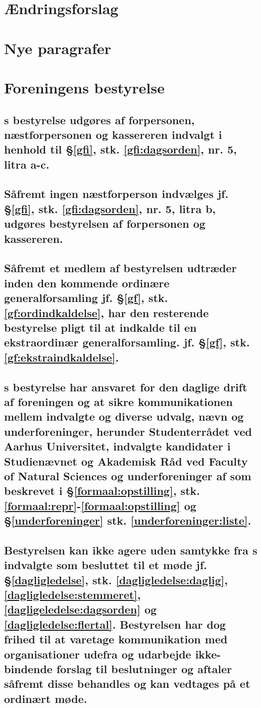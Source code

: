 \section*{Ændringsforslag}

\section*{Nye paragrafer}
\section*{Foreningens bestyrelse}

\subsection{\fagr{}s bestyrelse udgøres af forpersonen, næstforpersonen og kassereren indvalgt i henhold til §\ref{gfi}, stk. \ref{gfi:dagsorden}, nr. 5, litra a-c.}

\subsection{Såfremt ingen næstforperson indvælges jf. §\ref{gfi}, stk. \ref{gfi:dagsorden}, nr. 5, litra b, udgøres bestyrelsen af forpersonen og kassereren.}

\subsection{Såfremt et medlem af bestyrelsen udtræder inden den kommende ordinære generalforsamling jf. §\ref{gf}, stk. \ref{gf:ordindkaldelse}, har den resterende bestyrelse pligt til at indkalde til en ekstraordinær generalforsamling. jf. §\ref{gf}, stk. \ref{gf:ekstraindkaldelse}.}

\subsection{\fagr{}s bestyrelse har ansvaret for den daglige drift af foreningen og at sikre kommunikationen mellem indvalgte og diverse udvalg, nævn og underforeninger, herunder Studenterrådet ved Aarhus Universitet, indvalgte kandidater i Studienævnet og Akademisk Råd ved Faculty of Natural Sciences og underforeninger af \fagr{} som beskrevet i §\ref{formaal:opstilling}, stk. \ref{formaal:repr}-\ref{formaal:opstilling} og §\ref{underforeninger} stk. \ref{underforeninger:liste}.}

\subsection{Bestyrelsen kan ikke agere uden samtykke fra \fagr{}s indvalgte som besluttet til et møde jf. §\ref{dagligledelse}, stk. \ref{dagligledelse:daglig}, \ref{dagligledelse:stemmeret}, \ref{dagligeledelse:dagsorden} og \ref{dagligledelse:flertal}. Bestyrelsen har dog frihed til at varetage kommunikation med organisationer udefra og udarbejde ikke-bindende forslag til beslutninger og aftaler såfremt disse behandles og kan vedtages på et ordinært møde.}

